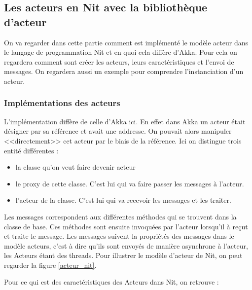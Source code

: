 \documentclass[11pt, a4paper]{article}
\begin{document}
\subsection{Les acteurs en Nit avec la bibliothèque d'acteur}
On va regarder dans cette partie comment est implémenté le modèle acteur dans le langage de programmation Nit et en quoi cela diffère d'Akka. Pour cela on regardera comment sont créer les acteurs, leurs caractéristiques et l'envoi de messages. On regardera aussi un exemple pour comprendre l’instanciation d'un acteur.

\subsubsection{Implémentations des acteurs}
L'implémentation diffère de celle d'Akka ici. En effet dans Akka un acteur était désigner par sa référence et avait une addresse. On pouvait alors manipuler <<directement>> cet acteur par le biais de la référence. Ici on distingue trois entité différentes :
\newline
\begin{itemize}
\item la classe qu'on veut faire devenir acteur
\item le proxy de cette classe. C'est lui qui va faire passer les messages à l'acteur.
\item l'acteur de la classe. C'est lui qui va recevoir les messages et les traiter.\\
\end{itemize}
\par 
Les messages correspondent aux différentes méthodes qui se trouvent dans la classe de base. Ces méthodes sont ensuite invoquées par l'acteur lorsqu'il à reçut et traite le message. Les messages suivent la propriétés des messages dans le modèle acteurs, c'est à dire qu'ils sont envoyés de manière asynchrone à l'acteur, les Acteurs étant des threads. Pour illustrer le modèle d'acteur de Nit, on peut regarder la figure \ref{acteur_nit}.
\par 
Pour ce qui est des caractéristiques des Acteurs dans Nit, on retrouve :
\end{document}
